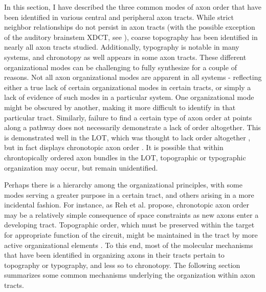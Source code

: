 In this section, I have described the three common modes of axon order that have been identified in various central and peripheral axon tracts.
While strict neighbor relationships do not persist in axon tracts (with the possible exception of the auditory brainstem XDCT, see ), coarse topography has been identified in nearly all axon tracts studied.
Additionally, typography is notable in many systems, and chronotopy as well appears in some axon tracts.
These different organizational modes can be challenging to fully synthesize for a couple of reasons.
Not all axon organizational modes are apparent in all systems - reflecting either a true lack of certain organizational modes in certain tracts, or simply a lack of evidence of such modes in a particular system.
One organizational mode might be obscured by another, making it more difficult to identify in that particular tract.
Similarly, failure to find a certain type of axon order at points along a pathway does not necessarily demonstrate a lack of order altogether.
This is demonstrated well in the LOT, which was thought to lack order altogether \cite{price1975observation}, but in fact displays chronotopic axon order \cite{yamatani2004chronotopic}.
It is possible that within chrontopically ordered axon bundles in the LOT, topographic or typographic organization may occur, but remain unidentified.

Perhaps there is a hierarchy among the organizational principles, with some modes serving a greater purpose in a certain tract, and others arising in a more incidental fashion.
For instance, as Reh et al.  propose, chronotopic axon order may be a relatively simple consequence of space constraints as new axons enter a developing tract.
Topographic order, which must be preserved within the target for appropriate function of the circuit, might be maintained in the tract by more active organizational elements \cite{reh1983organization}.
To this end, most of the molecular mechanisms that have been identified in organizing axons in their tracts pertain to topography or typography, and less so to chronotopy.
The following section summarizes some common mechanisms underlying the organization within axon tracts.